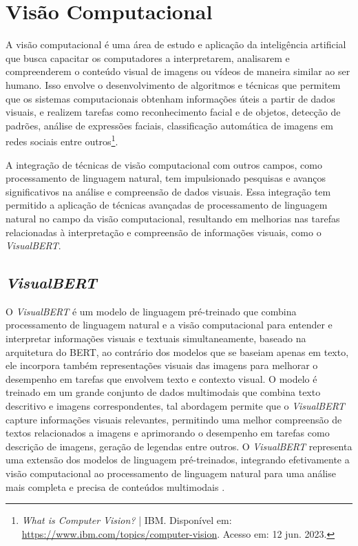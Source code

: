 \section{Visão Computacional}

A visão computacional é uma área de estudo e aplicação da inteligência artificial que busca capacitar os computadores a interpretarem, analisarem e compreenderem o conteúdo visual de imagens ou vídeos de maneira similar ao ser humano. Isso envolve o desenvolvimento de algoritmos e técnicas que permitem que os sistemas computacionais obtenham informações úteis a partir de dados visuais, e realizem tarefas como reconhecimento facial e de objetos, detecção de padrões, análise de expressões faciais, classificação automática de imagens em redes sociais entre outros\footnote{\textit{What is Computer Vision?} | IBM. Disponível em: \url{https://www.ibm.com/topics/computer-vision}. Acesso em: 12 jun. 2023.}.

A integração de técnicas de visão computacional com outros campos, como processamento de linguagem natural, tem impulsionado pesquisas e avanços significativos na análise e compreensão de dados visuais. Essa integração tem permitido a aplicação de técnicas avançadas de processamento de linguagem natural no campo da visão computacional, resultando em melhorias nas tarefas relacionadas à interpretação e compreensão de informações visuais, como o \textit{VisualBERT}.

\subsection{\textit{VisualBERT}}

O \textit{VisualBERT} é um modelo de linguagem pré-treinado que combina processamento de linguagem natural e a visão computacional para entender e interpretar informações visuais e textuais simultaneamente, baseado na arquitetura do BERT, ao contrário dos modelos que se baseiam apenas em texto, ele incorpora também representações visuais das imagens para melhorar o desempenho em tarefas que envolvem texto e contexto visual. O modelo é treinado em um grande conjunto de dados multimodais que combina texto descritivo e imagens correspondentes, tal abordagem permite que o \textit{VisualBERT} capture informações visuais relevantes, permitindo uma melhor compreensão de textos relacionados a imagens e aprimorando o desempenho em tarefas como descrição de imagens, geração de legendas entre outros. O \textit{VisualBERT} representa uma extensão dos modelos de linguagem pré-treinados, integrando efetivamente a visão computacional ao processamento de linguagem natural para uma análise mais completa e precisa de conteúdos multimodais \cite{VisualBERTArt}.

